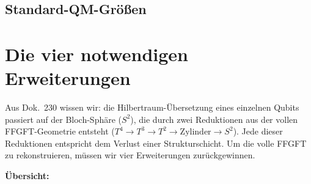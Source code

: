 \subsection*{Standard-QM-Größen}

\begin{center}
\renewcommand{\arraystretch}{1.3}
{\small
{}
}
\renewcommand{\arraystretch}{1.0}
\end{center}

\section*{Die vier notwendigen Erweiterungen}

Aus Dok.~230 wissen wir: die Hilbertraum-Übersetzung eines einzelnen
Qubits passiert auf der Bloch-Sphäre ($S^2$), die durch zwei
Reduktionen aus der vollen FFGFT-Geometrie entsteht
($T^4 \to T^3 \to T^2 \to \text{Zylinder} \to S^2$). Jede dieser
Reduktionen entspricht dem Verlust einer Strukturschicht. Um die
volle FFGFT zu rekonstruieren, müssen wir vier Erweiterungen
zurückgewinnen.

\textbf{Übersicht:}

